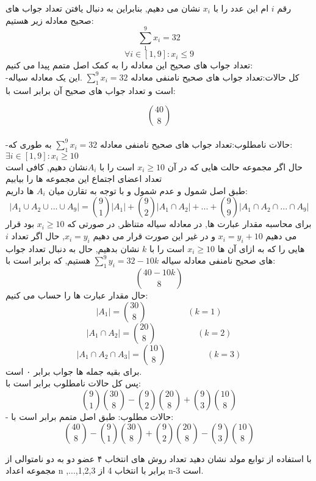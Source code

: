 \documentclass[11pt,largemargins]{h2wp}
\begin{document}
رقم $i$ ام این عدد را با $x_i$ نشان می دهیم, بنابراین به دنبال یافتن تعداد جواب های صحیح معادله زیر هستیم:
    \[\sum\limits_1^9 x_i=32\]
    \[\forall i \in [1,9] : x_i\leq 9\]
  تعداد جواب های صحیح این معادله را به کمک اصل متمم پیدا می کنیم:\\
     -کل حالات:تعداد جواب های صحیح نامنفی معادله  $\sum\limits_1^9 x_i=32 $ .این یک معادله سیاله است و تعداد جواب های صحیح آن برابر است با:
     
     \[\binom{40}{8}\]\\
    -حالات نامطلوب:تعداد جواب های صحیح نامنفی معادله $\sum\limits_1^9 x_i=32$  
     به طوری که:
     $\exists i \in [1,9] : x_i\geq 10$\\
     حال اگر مجموعه حالت هایی که در آن $x_i\geq 10 $ است را با $A_i$نشان دهیم, کافی است تعداد اعضای اجتماع این مجموعه ها را بیابیم\\ 
     طبق اصل شمول و عدم شمول و با توجه به تقارن میان $A_i$ ها داریم: 
     \[|A_1\cup A_2\cup... \cup A_9|=\binom{9}{1}|A_1|+\binom{9}{2}|A_1\cap A_2|+...+\binom{9}{9}|A_1\cap A_2\cap...\cap A_9|\]
   برای محاسبه مقدار عبارت ها, در معادله سیاله متناظر, در صورتی که $x_i\geq 10$ بود قرار می دهیم $x_i=y_i+10 $ و در غیر این صورت قرار می دهیم $x_i=y_i$, حال اگر تعداد $i$ هایی را که به ازای آن ها $x_i\geq 10 $ است را با $k$ نشان بدهیم, حال به دنبال تعداد جواب های صحیح نامنفی معادله سیاله $\sum\limits_1^9 y_i=32-10k $ هستیم, که برابر است با: 
   \[\binom{40-10k}{8}\] 
    حال مقدار عبارت ها را حساب می کنیم:\\
    \[|A_1|=\binom{30}{8}\hspace{2cm} (k=1)\]
    \[|A_1\cap A_2|=\binom{20}{8}\hspace{2cm} (k=2)\]
    \[|A_1\cap A_2\cap A_3|=\binom{10}{8}\hspace{2cm} (k=3)\]
    برای بقیه جمله ها جواب برابر ۰ است.\\
    پس کل حالات نامطلوب برابر است با:
    \[\binom{9}{1}\binom{30}{8}-\binom{9}{2}\binom{20}{8}+\binom{9}{3}\binom{10}{8}\]
     - حالات مطلوب: طبق اصل متمم برابر است با:
     \[\binom{40}{8}- \binom{9}{1}\binom{30}{8}+\binom{9}{2}\binom{20}{8}-\binom{9}{3}\binom{10}{8}\]
    
    

\question 
   با استفاده از توابع مولد نشان دهید تعداد روش های انتخاب ۴ عضو دو به دو  نامتوالی از مجموعه اعداد n
			 ,...,1,2,3
			 برابر با 
			 انتخاب 4 از n-3 است.
			 
\end{document}
